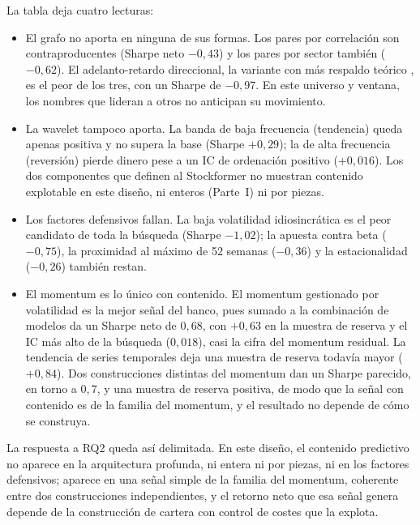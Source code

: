 

La tabla deja cuatro lecturas:
\begin{itemize}
  \item El grafo no aporta en ninguna de sus formas. Los pares por correlación son
  contraproducentes (Sharpe neto $-0{,}43$) y los pares por sector también ($-0{,}62$). El
  adelanto-retardo direccional, la variante con más respaldo teórico
  \autocite{lomackinlay1990when}, es el peor de los tres, con un Sharpe de $-0{,}97$. En
  este universo y ventana, los nombres que lideran a otros no anticipan su movimiento.
  \item La wavelet tampoco aporta. La banda de baja frecuencia (tendencia) queda apenas
  positiva y no supera la base (Sharpe $+0{,}29$); la de alta frecuencia (reversión)
  pierde dinero pese a un IC de ordenación positivo ($+0{,}016$). Los dos componentes que
  definen al Stockformer no muestran contenido explotable en este diseño, ni enteros
  (Parte~I) ni por piezas.
  \item Los factores defensivos fallan. La baja volatilidad idiosincrática es el peor
  candidato de toda la búsqueda (Sharpe $-1{,}02$); la apuesta contra
  beta ($-0{,}75$), la proximidad al máximo de 52 semanas ($-0{,}36$) y la estacionalidad
  ($-0{,}26$) también restan.
  \item El momentum es lo único con contenido. El momentum gestionado por volatilidad es
  la mejor señal del banco, pues sumado a la combinación de modelos da un Sharpe neto de
  $0{,}68$, con $+0{,}63$ en la muestra de reserva y el IC más alto de la
  búsqueda ($0{,}018$), casi la cifra del momentum residual. La tendencia de series
  temporales deja una muestra de reserva todavía mayor ($+0{,}84$). Dos construcciones
  distintas del momentum dan un Sharpe parecido, en torno a $0{,}7$, y una muestra de
  reserva positiva, de modo que la señal con contenido es de la familia del momentum, y el resultado
  no depende de cómo se construya.
\end{itemize}

La respuesta a RQ2 queda así delimitada. En este diseño, el contenido
predictivo no aparece en la arquitectura profunda, ni entera ni por piezas, ni en los
factores defensivos; aparece en una señal simple de la familia del momentum, coherente
entre dos construcciones independientes, y el retorno neto que esa señal genera depende de
la construcción de cartera con control de costes que la explota.
